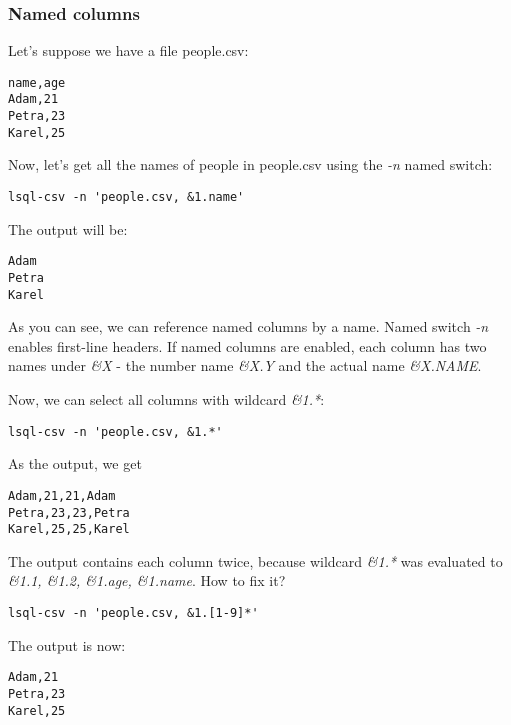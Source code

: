 \subsubsection{Named columns}
Let's suppose we have a file people.csv:
\begin{verbatim}
name,age                                                                                                                                                                                                                                   
Adam,21                                                                                                                                                                                                                                    
Petra,23                                                                                                                                                                                                                                   
Karel,25
\end{verbatim}

Now, let's get all the names of people in people.csv using the \textit{-n} named switch:
\begin{verbatim}
lsql-csv -n 'people.csv, &1.name'
\end{verbatim}
The output will be:
\begin{verbatim}
Adam
Petra
Karel
\end{verbatim}

As you can see, we can reference named columns by a name. Named switch \textit{-n} enables first-line headers.
If named columns are enabled, each column has two names under \textit{\&X} - the number name \textit{\&X.Y} and the actual name \textit{\&X.NAME}.

Now, we can select all columns with wildcard \textit{\&1.*}:
\begin{verbatim}
lsql-csv -n 'people.csv, &1.*'
\end{verbatim}
As the output, we get
\begin{verbatim}
Adam,21,21,Adam
Petra,23,23,Petra
Karel,25,25,Karel
\end{verbatim}

The output contains each column twice, because wildcard \textit{\&1.*} was evaluated to \textit{\&1.1, \&1.2, \&1.age, \&1.name}.
How to fix it?
\begin{verbatim}
lsql-csv -n 'people.csv, &1.[1-9]*'
\end{verbatim}
The output is now:
\begin{verbatim}
Adam,21
Petra,23
Karel,25
\end{verbatim}

